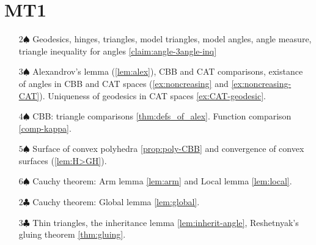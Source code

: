 \chapter*{MT1}

\begin{itemize}
\item[$2\spadesuit$] Geodesics, hinges, triangles, model triangles, model angles, angle measure, triangle inequality for angles \ref{claim:angle-3angle-inq}
\vskip1.1mm
\item[$3\spadesuit$] Alexandrov's lemma (\ref{lem:alex}), CBB and CAT comparisons,
existance of angles in CBB and CAT spaces (\ref{ex:noncreasing} and \ref{ex:noncreasing-CAT}).
Uniqueness of geodesics in CAT spaces \ref{ex:CAT-geodesic}.
\vskip1.1mm
\item[$4\spadesuit$] CBB: triangle comparisons \ref{thm:defs_of_alex}. Function comparison \ref{comp-kappa}.
\vskip1.1mm
\item[$5\spadesuit$] Surface of convex polyhedra \ref{prop:poly-CBB} and convergence of convex surfaces (\ref{lem:H>GH}).
\vskip1.1mm
\item[$6\spadesuit$] Cauchy theorem: Arm lemma \ref{lem:arm} and Local lemma \ref{lem:local}.
\vskip1.1mm
\item[$2\clubsuit$] Cauchy theorem: Global lemma \ref{lem:global}.
\vskip1.1mm
\item[$3\clubsuit$] Thin triangles, the inheritance lemma \ref{lem:inherit-angle}, Reshetnyak's gluing theorem \ref{thm:gluing}.

\end{itemize}
